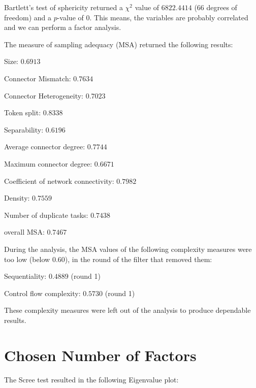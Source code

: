 \documentclass[a4paper]{article}
\begin{document}
Bartlett's test of sphericity returned a $\chi^2$ value of $6822.4414$ ($66$ degrees of freedom) and a $p$-value of $0$.
This means, the variables are probably correlated and we can perform a factor analysis.

\noindent
The measure of sampling adequacy (MSA) returned the following results:
\begin{compactitem}
\item Size: $0.6913$
\item Connector Mismatch: $0.7634$
\item Connector Heterogeneity: $0.7023$
\item Token split: $0.8338$
\item Separability: $0.6196$
\item Average connector degree: $0.7744$
\item Maximum connector degree: $0.6671$
\item Coefficient of network connectivity: $0.7982$
\item Density: $0.7559$
\item Number of duplicate tasks: $0.7438$
\item overall MSA: $0.7467$
\end{compactitem}

\noindent
During the analysis, the MSA values of the following complexity measures were too low (below $0.60$), in the round of the filter that removed them:
\begin{compactitem}
\item Sequentiality: $0.4889$ (round 1)
\item Control flow complexity: $0.5730$ (round 1)
\end{compactitem}

These complexity measures were left out of the analysis to produce dependable results.

\section*{Chosen Number of Factors}
\noindent
The Scree test resulted in the following Eigenvalue plot:
\begin{center}
\end{center}
\end{document}
